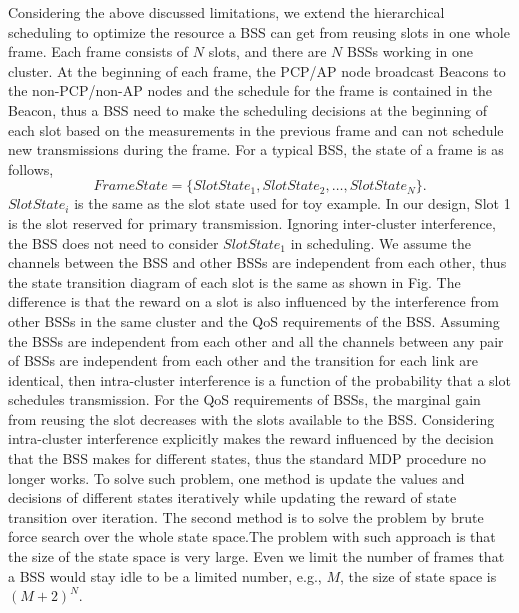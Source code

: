 \documentclass[10pt, conference, letterpaper]{IEEEtran}
\begin{document}
Considering the above discussed limitations, we extend the hierarchical scheduling to optimize the resource a BSS can get from reusing slots in one whole frame. Each frame consists of $N$ slots, and there are $N$ BSSs working in one cluster. At the beginning of each frame, the PCP/AP node broadcast Beacons to the non-PCP/non-AP nodes and the schedule for the frame is contained in the Beacon, thus a BSS need to make the scheduling decisions at the beginning of each slot based on the measurements in the previous frame and can not schedule new transmissions during the frame. For a typical BSS, the state of a frame is as follows, 
$$FrameState = \{SlotState_1, SlotState_2, \ldots, SlotState_N\}.$$
$SlotState_i$ is the same as the slot state used for toy example. In our design, Slot 1 is the slot reserved for primary transmission. Ignoring inter-cluster interference, the BSS does not need to consider $SlotState_1$ in scheduling. We assume the channels between the BSS and other BSSs are independent from each other, thus the state transition diagram of each slot is the same as shown in Fig. %
The difference is that the reward on a slot is also influenced by the interference from other BSSs in the same cluster and the QoS requirements of the BSS. Assuming the BSSs are independent from each other and all the channels between any pair of BSSs are independent from each other and the transition for each link are identical, then intra-cluster interference is a function of the probability that a slot schedules transmission. For the QoS requirements of BSSs, the marginal gain from reusing the slot decreases with the slots available to the BSS. Considering intra-cluster interference explicitly makes the reward influenced by the decision that the BSS makes for different states, thus the standard MDP procedure no longer works. To solve such problem, one method is update the values and decisions of different states iteratively while updating the reward of state transition over iteration. The second method is to solve the problem by brute force search over the whole state space.The problem with such approach is that the size of the state space is very large. Even we limit the number of frames that a BSS would stay idle to be a limited number, e.g., $M$, the size of state space is $(M+2)^{N}$.
\end{document}
